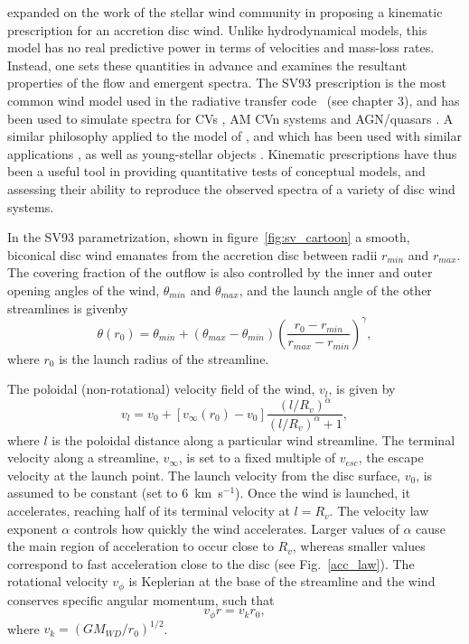 \cite[][hereafter SV93]{SV93} 
expanded on the work of the stellar wind community \citep[e.g.][]{AL85} 
in proposing a kinematic prescription for an accretion disc wind. Unlike 
hydrodynamical models, this model has no real predictive power in terms of velocities
and mass-loss rates. Instead, one sets these quantities in advance and examines the 
resultant properties of the flow and emergent spectra. The SV93 prescription
is the most common wind model used in the radiative transfer code \py\ (see chapter 3),
and has been used to simulate spectra for CVs \citep[][chapter 4]{LK02, M15}, 
AM CVn systems \citep{kusterer2014} and AGN/quasars 
\citep[][chapter 5]{higginbottom2013, M16, yong2016}. 
A similar philosophy applied to the model of \cite{KWD95}, and which has been used
with similar applications \citep{LK02, simlong2008, sim2010}, as 
well as young-stellar objects \citep[YSOs;][]{simmacro2005}.
Kinematic prescriptions have thus been a useful tool in providing quantitative
tests of conceptual models, and assessing their ability to reproduce
the observed spectra of a variety of disc wind systems.

In the SV93 parametrization, shown in figure~\ref{fig:sv_cartoon} 
a smooth, biconical disc wind emanates from the accretion disc between 
radii $r_{min}$ and $r_{max}$. The covering fraction of the outflow is 
also controlled by the inner and outer opening angles of the wind, $\theta_{min}$ and
$\theta_{max}$, and the launch angle of the other streamlines is givenby 
\begin{equation}
\theta(r_0) = \theta_{min} + (\theta_{max} - \theta_{min}) \left(\frac{r_0 - r_{min}}{r_{max} - r_{min}} \right)^{\gamma},
\label{eq:wind_theta}
\end{equation}
where $r_0$ is the launch radius of the streamline.

The poloidal (non-rotational) velocity field of the wind, $v_l$, is given by
\begin{equation}
v_l=v_0+\left[v_{\infty}(r_0)-v_0\right]\frac{\left(l/R_v\right)^{\alpha}}{\left(l/R_v\right)^{\alpha}+1},
\label{eq:v_law}
\end{equation}
where $l$ is the poloidal distance along a particular wind
streamline. The terminal velocity along a streamline, $v_{\infty}$, is
set to a fixed multiple of $v_{esc}$, the escape velocity at the launch
point. The launch velocity from the disc surface, $v_0$, is assumed to
be constant (set to $6$~km~s$^{-1}$). Once the wind is launched, it
accelerates, reaching half of its terminal velocity at $l = R_v$. The
velocity law exponent $\alpha$ controls how quickly the wind
accelerates. Larger values of $\alpha$ cause the main region of 
acceleration to occur close to $R_v$, whereas smaller values
correspond to fast acceleration close to the disc (see
Fig.~\ref{acc_law}). The rotational velocity $v_\phi$ is 
Keplerian at the base of the streamline 
and the wind conserves specific angular momentum, such that
\begin{equation}
v_\phi r = v_{k} r_0,
\label{eq:vrot}
\end{equation}
where $v_{k}=(GM_{WD}/r_0)^{1/2}$.

